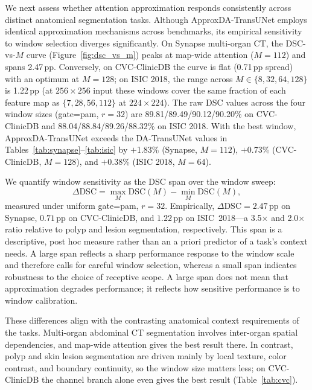 We next assess whether attention approximation responds consistently across distinct anatomical segmentation tasks. Although ApproxDA-TransUNet employs identical approximation mechanisms across benchmarks, its empirical sensitivity to window selection diverges significantly. On Synapse multi-organ CT, the DSC-vs-$M$ curve (Figure~\ref{fig:dsc_vs_m}) peaks at map-wide attention ($M{=}112$) and spans 2.47\,pp. Conversely, on CVC-ClinicDB the curve is flat (0.71\,pp spread) with an optimum at $M{=}128$; on ISIC 2018, the range across $M{\in}\{8,32,64,128\}$ is 1.22\,pp (at $256{\times}256$ input these windows cover the same fraction of each feature map as $\{7,28,56,112\}$ at $224{\times}224$).
The raw DSC values across the four window sizes (gate=pam, $r{=}32$) are 89.81/89.49/90.12/90.20\% on CVC-ClinicDB and 88.04/88.84/89.26/88.32\% on ISIC 2018. With the best window, ApproxDA-TransUNet exceeds the DA-TransUNet values in Tables~\ref{tab:synapse}--\ref{tab:isic} by $+$1.83\% (Synapse, $M{=}112$), $+$0.73\% (CVC-ClinicDB, $M{=}128$), and $+$0.38\% (ISIC 2018, $M{=}64$).

We quantify window sensitivity as the DSC span over the window sweep:
\begin{equation}
  \Delta\text{DSC} = \max_{M} \text{DSC}(M) - \min_{M} \text{DSC}(M),
\end{equation}
measured under uniform gate=pam, $r{=}32$. Empirically, $\Delta\text{DSC} = 2.47$\,pp on Synapse, $0.71$\,pp on CVC-ClinicDB, and $1.22$\,pp on ISIC~2018---a 3.5$\times$ and 2.0$\times$ ratio relative to polyp and lesion segmentation, respectively. This span is a descriptive, post hoc measure rather than an a priori predictor of a task's context needs. A large span reflects a sharp performance response to the window scale and therefore calls for careful window selection, whereas a small span indicates robustness to the choice of receptive scope. A large span does not mean that approximation degrades performance; it reflects how sensitive performance is to window calibration.

These differences align with the contrasting anatomical context requirements of the tasks. Multi-organ abdominal CT segmentation involves inter-organ spatial dependencies, and map-wide attention gives the best result there. In contrast, polyp and skin lesion segmentation are driven mainly by local texture, color contrast, and boundary continuity, so the window size matters less; on CVC-ClinicDB the channel branch alone even gives the best result (Table~\ref{tab:cvc}).

